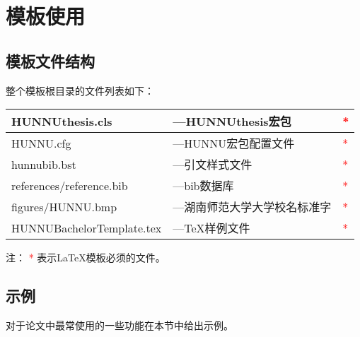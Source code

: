 \chapter{模板使用}
\section{模板文件结构\label{sec:files}}
整个模板根目录的文件列表如下：
\begin{center}
\begin{tabular}{|l|l|l|}
\hline
HUNNUthesis.cls & ---HUNNUthesis宏包 & \textcolor{red}{{*}}\\
\hline
HUNNU.cfg & ---HUNNU宏包配置文件 & \textcolor{red}{{*}}\\
\hline
hunnubib.bst & ---引文样式文件 & \textcolor{red}{{*}}\\
\hline
references/reference.bib & ---bib数据库 & \textcolor{red}{{*}}\\
\hline
figures/HUNNU.bmp & ---湖南师范大学大学校名标准字 & \textcolor{red}{{*}}\\
\hline
HUNNUBachelorTemplate.tex & ---\TeX{}样例文件 &\textcolor{red}{{*}}\\
\hline
\end{tabular}
\end{center}
注： \textcolor{red}{{*}} 表示\LaTeX{}模板必须的文件。
\section{示例}
对于论文中最常使用的一些功能在本节中给出示例。
